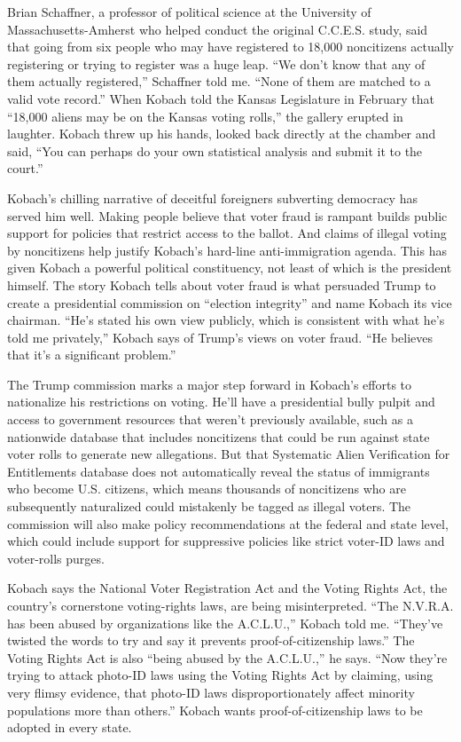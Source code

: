 Brian Schaffner, a professor of political science at the University of
Massachusetts-Amherst who helped conduct the original C.C.E.S. study,
said that going from six people who may have registered to 18,000
noncitizens actually registering or trying to register was a huge leap.
``We don't know that any of them actually registered,'' Schaffner told
me. ``None of them are matched to a valid vote record.'' When Kobach
told the Kansas Legislature in February that ``18,000 aliens may be on
the Kansas voting rolls,'' the gallery erupted in laughter. Kobach threw
up his hands, looked back directly at the chamber and said, ``You can
perhaps do your own statistical analysis and submit it to the court.''

Kobach's chilling narrative of deceitful foreigners subverting democracy
has served him well. Making people believe that voter fraud is rampant
builds public support for policies that restrict access to the ballot.
And claims of illegal voting by noncitizens help justify Kobach's
hard-line anti-immigration agenda. This has given Kobach a powerful
political constituency, not least of which is the president himself. The
story Kobach tells about voter fraud is what persuaded Trump to create a
presidential commission on ``election integrity'' and name Kobach its
vice chairman. ``He's stated his own view publicly, which is consistent
with what he's told me privately,'' Kobach says of Trump's views on
voter fraud. ``He believes that it's a significant problem.''

The Trump commission marks a major step forward in Kobach's efforts to
nationalize his restrictions on voting. He'll have a presidential bully
pulpit and access to government resources that weren't previously
available, such as a nationwide database that includes noncitizens that
could be run against state voter rolls to generate new allegations. But
that Systematic Alien Verification for Entitlements database does not
automatically reveal the status of immigrants who become U.S. citizens,
which means thousands of noncitizens who are subsequently naturalized
could mistakenly be tagged as illegal voters. The commission will also
make policy recommendations at the federal and state level, which could
include support for suppressive policies like strict voter-ID laws and
voter-rolls purges.

Kobach says the National Voter Registration Act and the Voting Rights
Act, the country's cornerstone voting-rights laws, are being
misinterpreted. ``The N.V.R.A. has been abused by organizations like the
A.C.L.U.,'' Kobach told me. ``They've twisted the words to try and say
it prevents proof-of-citizenship laws.'' The Voting Rights Act is also
``being abused by the A.C.L.U.,'' he says. ``Now they're trying to
attack photo-ID laws using the Voting Rights Act by claiming, using very
flimsy evidence, that photo-ID laws disproportionately affect minority
populations more than others.'' Kobach wants proof-of-citizenship laws
to be adopted in every state.

